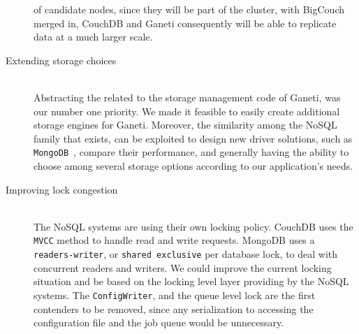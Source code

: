 \begin{description}
    of candidate nodes, since they will be part of the cluster, with BigCouch
    merged in, CouchDB and Ganeti consequently will be able to replicate data at
    a much larger scale.
  \item[Extending storage choices] \hfill \\
    Abstracting the related to the storage management code of Ganeti, was our
    number one priority. We made it feasible to easily create additional storage
    engines for Ganeti. Moreover, the similarity among the NoSQL family that
    exists, can be exploited to design new driver solutions, such as
    \texttt{MongoDB}~, compare their performance,
    and generally having the ability to choose among several storage options
    according to our application's needs.
  \item[Improving lock congestion] \hfill \\
    The NoSQL systems are using their own locking policy. CouchDB uses the
    \texttt{MVCC} method to handle read and write requests. MongoDB
    uses a \texttt{readers-writer}, or \texttt{shared exclusive} per
    database lock, to deal with concurrent readers and writers. We could improve
    the current locking situation and be based on the locking level layer
    providing by the NoSQL systems. The \texttt{ConfigWriter}, and the queue
    level lock are the first contenders to be removed, since any serialization
    to accessing the configuration file and the job queue would be unnecessary.
\end{description}
